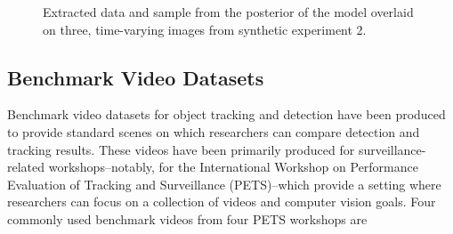 \documentclass[smallcondensed, final]{svjour3}
\begin{document}
\begin{figure}[h]
        \caption{\label{fig:synth2_alphaimg} Extracted data and sample from the posterior of the model overlaid on three, time-varying images from synthetic experiment 2.}
\end{figure}










\subsection{Benchmark Video Datasets}

Benchmark video datasets for object tracking and detection have been produced to provide standard scenes on which researchers can compare detection and tracking results. These videos have been primarily produced for surveillance-related workshops--notably, for the International Workshop on Performance Evaluation of Tracking and Surveillance (PETS)--which provide a setting where researchers can focus on a collection of videos and computer vision goals. Four commonly used benchmark videos from four PETS workshops are 
\end{document}
